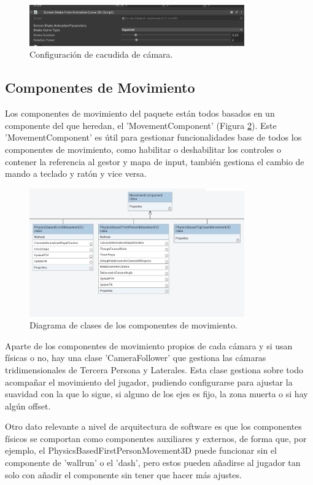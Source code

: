 \begin{figure}[H]
  \centering
    \includegraphics[width=350px,clip=true]{screenshake2.png}
  \caption{Configuración de cacudida de cámara.}
  \label{fig:screenshake2}
\end{figure}


\subsection{Componentes de Movimiento}
Los componentes de movimiento del paquete están todos basados en un componente del que heredan, el 'MovementComponent' (Figura \ref{fig:umlMovimiento}). Este 'MovementComponent' 
es útil para gestionar funcionalidades base de todos los componentes de movimiento, como habilitar o deshabilitar los controles o contener la referencia al gestor y mapa de input, 
también gestiona el cambio de mando a teclado y ratón y vice versa.

\begin{figure}[H]
  \centering
    \includegraphics[width=350px,clip=true]{Movement.png}
  \caption{Diagrama de clases de los componentes de movimiento.}
  \label{fig:umlMovimiento}
\end{figure}

Aparte de los componentes de movimiento propios de cada cámara y si usan físicas o no, hay una clase 'CameraFollower' que gestiona las cámaras tridimensionales de Tercera Persona 
y Laterales. Esta clase gestiona sobre todo acompañar el movimiento del jugador, pudiendo configurarse para ajustar la suavidad con la que lo sigue, si alguno de los ejes 
es fijo, la zona muerta o si hay algún offset.

Otro dato relevante a nivel de arquitectura de software es que los componentes físicos se comportan como componentes auxiliares y externos, de forma que, por ejemplo,
 el PhysicsBasedFirstPersonMovement3D puede funcionar sin el componente de 'wallrun' o el 'dash', pero estos pueden añadirse al jugador tan solo con añadir el componente sin
 tener que hacer más ajustes.
 
